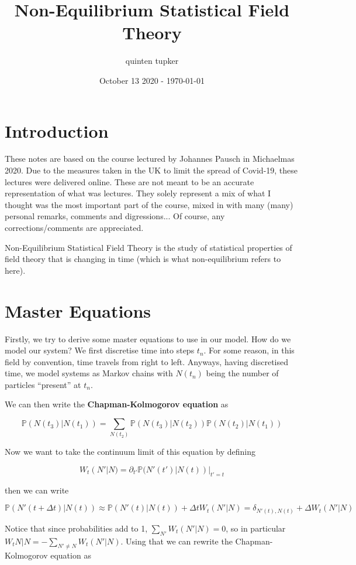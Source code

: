 \documentclass{article}
\title{Non-Equilibrium Statistical Field Theory}
\author{quinten tupker}
\date{October 13 2020 - \today}
\theoremstyle{definition}
\begin{document}
\maketitle

\section*{Introduction}

These notes are based on the course lectured by Johannes Pausch in Michaelmas
2020. Due to the measures taken in the UK to limit the spread of
Covid-19, these lectures were delivered online. These are not meant to be an
accurate representation of what was lectures. They solely represent a mix of
what I thought was the most important part of the course, mixed in with many
(many) personal remarks, comments and digressions... Of course, any
corrections/comments are appreciated.

Non-Equilibrium Statistical Field Theory is the study of statistical properties
of field theory that is changing in time (which is what non-equilibrium refers
to here).

\section{Master Equations}

Firstly, we try to derive some master equations to use in our model. How do we
model our system? We first discretise time into steps $t_n$. For some reason, in
this field by convention, time travels from right to left. Anyways, having
discretised time, we model systems as Markov chains with $N(t_n)$ being the
number of particles ``present'' at $t_n$.

We can then write the \textbf{Chapman-Kolmogorov equation} as

$$ \mathbb{P}(N(t_3) | N(t_1)) = \sum_{N(t_2)} \mathbb{P}(N(t_3) | N(t_2))
\mathbb{P}(N(t_2) | N(t_1)) $$

Now we want to take the continuum limit of this equation by defining

$$ W_t(N' | N) = \partial_{t'} \mathbb{P}(N'(t') | N(t)) |_{t' = t} $$

then we can write

$$ \mathbb{P}(N'(t + \Delta t) | N(t)) \approx \mathbb{P}(N'(t) | N(t)) + \Delta
t W_t(N' | N) = \delta_{N'(t), N(t)} + \Delta W_t(N' | N) $$

Notice that since probabilities add to 1, $\sum_{N'} W_t(N' | N) = 0$, so in
particular $W_t{N | N} = - \sum_{N' \neq N} W_t(N' | N)$. Using
that we can rewrite the Chapman-Kolmogorov equation as
\end{document}
